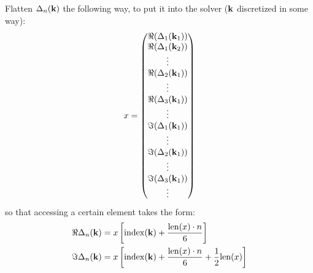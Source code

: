 Flatten \(\Delta_n (\bm{\mathrm{k}})\) the following way, to put it into the solver (\(\bm{\mathrm{k}}\) discretized in some way):
\begin{equation}
    x = \begin{pmatrix}
        \Re{(\Delta_1 (\bm{\mathrm{k}}_1))} \\
        \Re{(\Delta_1 (\bm{\mathrm{k}}_2))} \\
        \vdots \\
        \Re{(\Delta_2(\bm{\mathrm{k}}_1))} \\
        \vdots \\
        \Re{(\Delta_3(\bm{\mathrm{k}}_1))} \\
        \vdots \\
        \Im{(\Delta_1(\bm{\mathrm{k}}_1))} \\
        \vdots \\
        \Im{(\Delta_2(\bm{\mathrm{k}}_1))} \\
        \vdots \\
        \Im{(\Delta_3(\bm{\mathrm{k}}_1))} \\
        \vdots \\
    \end{pmatrix}
\end{equation}
so that accessing a certain element takes the form:
\begin{align}
    \Re{\Delta_n (\bm{\mathrm{k}})} &= x\left[\mathrm{index}(\bm{\mathrm{k}}) + \frac{\mathrm{len}(x) \cdot n}{6} \right] \\
    \Im{\Delta_n (\bm{\mathrm{k}})} &= x\left[\mathrm{index}(\bm{\mathrm{k}}) + \frac{\mathrm{len}(x) \cdot n}{6} + \frac{1}{2} \mathrm{len}(x) \right]
\end{align}
